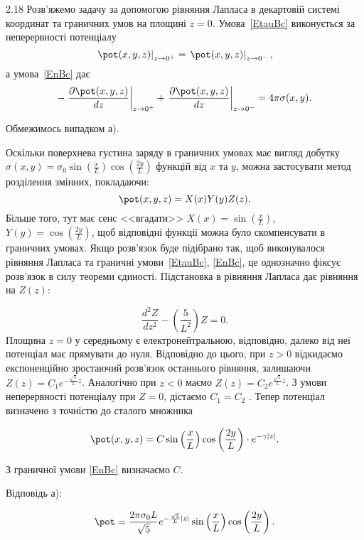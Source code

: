 \begin{Solution}{2.{18}}
    Розв'яжемо задачу за допомогою рівняння Лапласа в декартовій системі координат  та граничних умов на площині $z = 0$. Умова~\eqref{EtauBc} виконується за неперервності потенціалу
	\begin{equation*}\label{continuity}
		\left.\pot(x,y,z)\right|_{z \to 0^+} = \left.\pot(x,y,z)\right|_{z \to 0^-},
	\end{equation*}
	а умова~\eqref{EnBc} дає
	\begin{equation*}\label{boundary}
		-\left. \frac{\partial \pot(x,y,z)}{dz}\right|_{z \to 0^+} + \left. \frac{\partial \pot(x,y,z)}{dz}\right|_{z \to 0^-} =4\pi\sigma(x,y).
	\end{equation*}

	Обмежимось випадком а).

	Оскільки поверхнева густина заряду в граничних умовах має вигляд добутку $\sigma(x, y) = \sigma_0 \sin\left( \frac{x}{L}\right) \cos\left( \frac{2y}{L}\right) $ функцій від $x$ та $y$, можна застосувати метод розділення змінних, покладаючи:
    \[
        \pot(x,y,z) = X(x)Y(y)Z(z).
    \]
Більше того, тут має сенс <<вгадати>> $X(x) = \sin\left(\frac{x}{L}\right) $, $Y(y) = \cos\left(\frac{2y}{L}\right) $, щоб відповідні функції можна було скомпенсувати в граничних умовах. Якщо розв’язок буде підібрано так, щоб виконувалося рівняння Лапласа та граничні умови~\eqref{EtauBc}, \eqref{EnBc}, це однозначно фіксує розв'язок в силу теореми єдиності. Підстановка в рівняння Лапласа дає рівняння на $Z(z)$:

\begin{equation*}
    \frac{d^2Z}{dz^2} - \left( \frac{5}{L^2}\right) Z = 0.
\end{equation*}
Площина  $z = 0$ у середньому є електронейтральною, відповідно, далеко від неї потенціал має прямувати до нуля. Відповідно до цього, при $z >0$  відкидаємо експоненційно зростаючий розв’язок останнього рівняння, залишаючи $ Z(z) = C_1  e^{-\frac{\sqrt5}{L}z} $. Аналогічно при $z < 0$  маємо $ Z(z) = C_2  e^{\frac{\sqrt5}{L}z} $. З умови неперервності потенціалу при $Z = 0$, дістаємо $C_1 = C_2$ . Тепер потенціал визначено з точністю до сталого множника


	\begin{equation*}
		\pot (x,y,z) = C \sin\left( \frac{x}{L} \right)   \cos\left( \frac{2y}{L} \right)  \cdot e^{-\gamma |z|}.
	\end{equation*}
	
З граничної умови \eqref{EnBc} визначаємо $C$.

Відповідь а):

	\begin{equation*}
		\pot = \frac{2\pi\sigma_0 L}{\sqrt{5}}e^{-\frac{\sqrt{5}}{L}|z|}\sin\left( \frac{x}{L}\right) \cos\left( \frac{2y}{L}\right) .
	\end{equation*}
\end{Solution}
